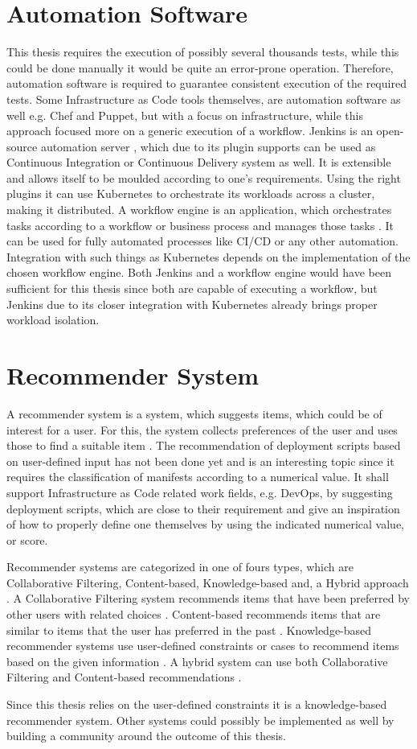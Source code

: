\section{Automation Software}
This thesis requires the execution of possibly several thousands tests, while this could be done manually it would be quite an error-prone operation. Therefore, automation software is required to guarantee consistent execution of the required tests. Some Infrastructure as Code tools themselves, are automation software as well e.g. Chef and Puppet, but with a focus on infrastructure, while this approach focused more on a generic execution of a workflow.
Jenkins is an open-source automation server \cite{jenkins}, which due to its plugin supports can be used as Continuous Integration or Continuous Delivery system as well. It is extensible and allows itself to be moulded according to one's requirements. Using the right plugins it can use Kubernetes to orchestrate its workloads across a cluster, making it distributed.
A workflow engine is an application, which orchestrates tasks according to a workflow or business process and manages those tasks \cite{workflow}. It can be used for fully automated processes like CI/CD or any other automation. Integration with such things as Kubernetes depends on the implementation of the chosen workflow engine.
Both Jenkins and a workflow engine would have been sufficient for this thesis since both are capable of executing a workflow, but Jenkins due to its closer integration with Kubernetes already brings proper workload isolation.

\section{Recommender System}
A recommender system is a system, which suggests items, which could be of interest for a user. For this, the system collects preferences of the user and uses those to find a suitable item \cite{recommender}.
The recommendation of deployment scripts based on user-defined input has not been done yet and is an interesting topic since it requires the classification of manifests according to a numerical value. It shall support Infrastructure as Code related work fields, e.g. DevOps, by suggesting deployment scripts, which are close to their requirement and give an inspiration of how to properly define one themselves by using the indicated numerical value, or score.

Recommender systems are categorized in one of fours types, which are Collaborative Filtering, Content-based, Knowledge-based and, a Hybrid approach \cite{recommender}\cite{recommender2}.
A Collaborative Filtering system recommends items that have been preferred by other users with related choices \cite{recommender}.
Content-based recommends items that are similar to items that the user has preferred in the past \cite{recommender}.
Knowledge-based recommender systems use user-defined constraints or cases to recommend items based on the given information \cite{recommender2}.
A hybrid system can use both Collaborative Filtering and Content-based recommendations \cite{recommender}\cite{recommender2}.

Since this thesis relies on the user-defined constraints it is a knowledge-based recommender system. Other systems could possibly be implemented as well by building a community around the outcome of this thesis.
